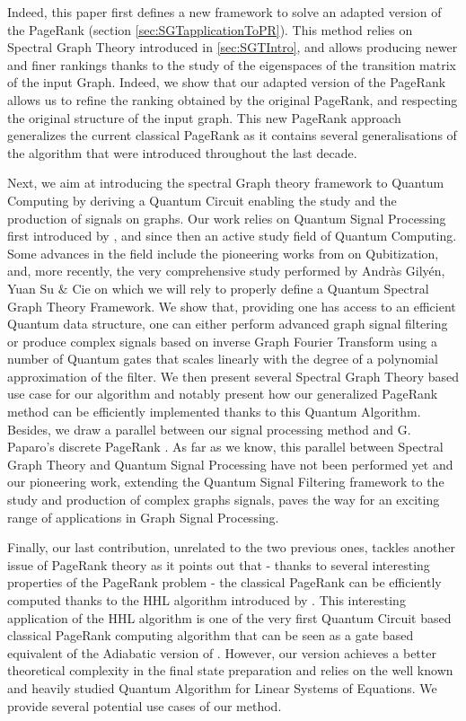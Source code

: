 \documentclass[sn-mathphys]{sn-jnl}%
\theoremstyle{thmstyleone}%
\theoremstyle{thmstyletwo}%
\theoremstyle{thmstylethree}%
\begin{document}
Indeed, this paper first defines a new framework to solve an adapted version of the
PageRank (section \ref{sec:SGTapplicationToPR}). This method relies on
Spectral Graph Theory introduced in \ref{sec:SGTIntro}, and allows
producing newer and finer rankings thanks to the study of the
eigenspaces of the transition matrix of the input Graph. Indeed, we
show that our adapted version of the PageRank allows us to refine the
ranking obtained by the original PageRank, and respecting the
original structure of the input graph. This new PageRank approach generalizes the current classical PageRank as it contains several generalisations of the algorithm that were introduced throughout the last decade. 

Next, we aim at introducing the spectral Graph theory framework to
Quantum Computing by deriving a Quantum Circuit enabling the study and
the production of signals on graphs. Our work relies on Quantum Signal
Processing first introduced by \cite{eldar_oppenheim_2002}, and since
then an active study field of Quantum Computing. Some advances in the
field include the pioneering works from \cite{Low_2019} on
Qubitization, and, more recently, the very comprehensive study
performed by Andràs Gilyén, Yuan Su $\&$ Cie
\cite{gilyen_su_low_wiebe_2019} on which we will rely to properly
define a Quantum Spectral Graph Theory Framework. We show that,
providing one has access to an efficient Quantum data structure, one
can either perform advanced graph signal filtering or produce complex
signals based on inverse Graph Fourier Transform using a number of
Quantum gates that scales linearly with the degree of a polynomial
approximation of the filter. We then present several Spectral Graph
Theory based use case for our algorithm and notably present how our
generalized PageRank method can be efficiently implemented thanks to
this Quantum Algorithm. Besides, we draw a parallel between our signal processing method and G. Paparo's discrete PageRank \cite{paparo_martin-delgado_2012}. As far as we know, this parallel between
Spectral Graph Theory and Quantum Signal Processing have not been
performed yet and our pioneering work, extending the Quantum Signal
Filtering framework to the study and production of complex graphs
signals, paves the way for an exciting range of applications in Graph
Signal Processing.

Finally, our last contribution, unrelated to the two previous ones, tackles another issue of PageRank theory as it points out that - thanks to several interesting properties of the PageRank problem - the classical PageRank can be efficiently computed thanks to the HHL algorithm introduced by \cite{Harrow_2009}. This interesting application of the HHL algorithm is one of the very
first Quantum Circuit based classical PageRank computing algorithm that can be
seen as a gate based equivalent of the Adiabatic version of
\cite{garnerone_zanardi_lidar_2012}. However, our version achieves a
better theoretical complexity in the final state preparation and
relies on the well known and heavily studied Quantum Algorithm for
Linear Systems of Equations. We provide several potential use cases of our method.
\end{document}
